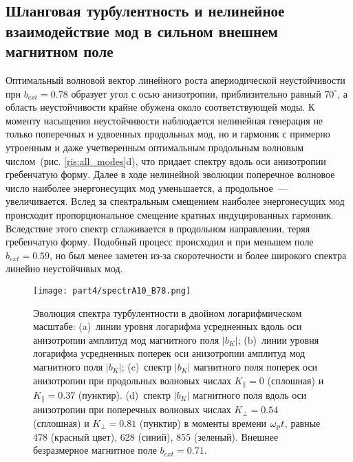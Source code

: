 \subsection{Шланговая турбулентность и нелинейное взаимодействие мод в сильном внешнем магнитном поле}
\label{part_spectr_b78}

Оптимальный волновой вектор линейного роста апериодической неустойчивости при  $b_{ext}=0.78$ образует угол с осью анизотропии, приблизительно равный  $70^\circ$, а область неустойчивости крайне обужена около соответствующей моды. К моменту насыщения неустойчивости наблюдается нелинейная генерация не только поперечных и удвоенных продольных мод, но и гармоник с примерно утроенным и даже учетверенным оптимальным продольным волновым числом~(рис. \ref{ris:all_modes}d), что придает спектру вдоль оси анизотропии гребенчатую форму. Далее в ходе нелинейной эволюции поперечное волновое число наиболее энергонесущих мод уменьшается, а продольное~--- увеличивается. Вслед за спектральным смещением наиболее энергонесущих мод происходит пропорциональное смещение кратных индуцированных гармоник. Вследствие этого спектр сглаживается в продольном направлении, теряя гребенчатую форму. Подобный процесс происходил и при меньшем поле $b_{ext}=0.59$, но был менее заметен из-за скоротечности и более широкого спектра линейно неустойчивых мод.

\begin{figure}[h!]

\texttt{[image: part4/spectrA10\_B78.png]}
\caption{Эволюция спектра турбулентности в двойном логарифмическом масштабе: (a)~линии уровня логарифма усредненных вдоль оси анизотропии амплитуд мод магнитного поля $|b_K|$; 
(b)~линии уровня логарифма усредненных поперек оси анизотропии амплитуд мод магнитного поля $|b_K|$; 
(c)~спектр $|b_K|$ магнитного поля поперек оси анизотропии при продольных волновых числах $K_\|=0$ (сплошная) и $K_\|=0.37$ (пунктир). 
(d)~спектр $|b_K|$ магнитного поля вдоль оси анизотропии при поперечных волновых числах $K_\perp=0.54$ (сплошная) и $K_\perp=0.81$ (пунктир) в моменты времени $\omega_\mathrm{p} t$, равные 478 (красный цвет), 628 (синий), 855 (зеленый). Внешнее безразмерное магнитное поле $b_{ext}=0.71$.
}
\label{ris:spectrA10_B78}
\end{figure}

